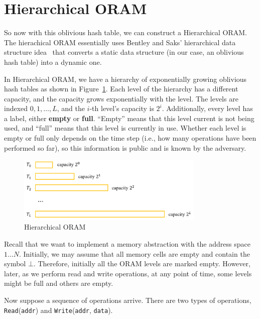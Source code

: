 \section{Hierarchical ORAM}

So now with this oblivious hash table, we can construct a Hierarchical ORAM.
The hierachical ORAM essentially uses
Bentley and Saks' hierarchical data structure idea~\cite{hierds} 
that converts
a static data structure (in our case, an oblivious hash table) 
into a dynamic one.

In Hierarchical ORAM, we have a hierarchy of exponentially growing oblivious hash tables as shown in Figure~\ref{fig:oram}.
Each level of the hierarchy has a different capacity, and the capacity grows exponentially with the level.
The levels are indexed $0, 1, \ldots, L$, and 
the $i$-th level's capacity is $2^i$.
Additionally, every level has a label, either \textbf{empty} or \textbf{full}.
``Empty'' means that this level current is not being used,
and ``full'' means that 
this level is currently in use.
Whether each level is empty or full only
depends on the time step (i.e., how many operations
have been performed so far), so this information is public and
is known by the adversary.

\begin{figure}[!h]
  \centering
  \includegraphics[width=0.8\textwidth]{fig1.png}
  \caption{Hierarchical ORAM}
  \label{fig:oram}
\end{figure}

Recall that we want to implement 
a memory abstraction with the address space $1 \ldots N$. Initially,
we may assume that all memory cells are empty and contain the symbol $\bot$. 
Therefore, initially all the ORAM levels are marked
empty.
However, later, as we perform read and write operations, at any point of time, 
some levels might be full and others are empty.

Now suppose a sequence of operations arrive.
There are two types of operations, 
\texttt{Read}(\texttt{addr}) and \texttt{Write}(\texttt{addr}, \texttt{data}).

